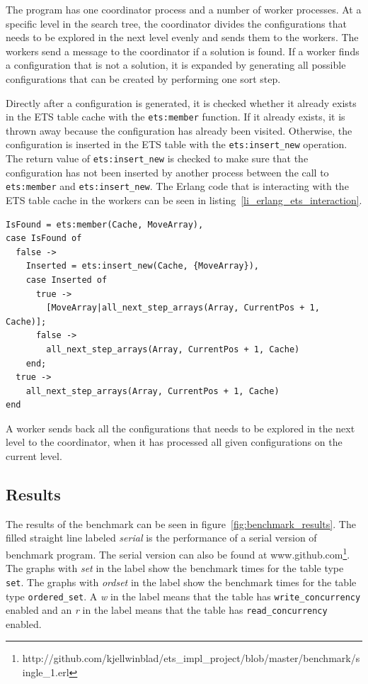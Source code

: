 \documentclass[aps,pre,preprint,nofootinbib]{revtex4}
\begin{document}
    The program has one coordinator process and a number of worker processes.
    At a specific level in the search tree, the coordinator divides the configurations that needs to be explored in the next level evenly and sends them to the workers.
    The workers send a message to the coordinator if a solution is found.
    If a worker finds a configuration that is not a solution, it is expanded by generating all possible configurations that can be created by performing one sort step.
    
    Directly after a configuration is generated, it is checked whether it already exists in the ETS table cache with the \verb|ets:member| function.
    If it already exists, it is thrown away because the configuration has already been visited.
    Otherwise, the configuration is inserted in the ETS table with the \verb|ets:insert_new| operation.
    The return value of \verb|ets:insert_new| is checked to make sure that the configuration has not been inserted by another process between the call to \verb|ets:member| and \verb|ets:insert_new|.
    The Erlang code that is interacting with the ETS table cache in the workers can be seen in listing~\ref{li_erlang_ets_interaction}.

    \lstset{language=erlang, caption=Worker code that is interacting with ETS, label=li_erlang_ets_interaction} 
\begin{lstlisting}[float=htb] 
IsFound = ets:member(Cache, MoveArray),
case IsFound of
  false ->
    Inserted = ets:insert_new(Cache, {MoveArray}),
    case Inserted of
      true ->
        [MoveArray|all_next_step_arrays(Array, CurrentPos + 1, Cache)];
      false ->
        all_next_step_arrays(Array, CurrentPos + 1, Cache)
    end;
  true ->
    all_next_step_arrays(Array, CurrentPos + 1, Cache)
end
\end{lstlisting}
    
    A worker sends back all the configurations that needs to be explored in the next level to the coordinator, when it has processed all given configurations on the current level.


\subsection{Results}

  The results of the benchmark can be seen in figure~\ref{fig:benchmark_results}.
  The filled straight line labeled \emph{serial} is the performance of a serial version of benchmark program.
  The serial version can also be found at www.github.com\footnote{http://github.com/kjellwinblad/ets\_impl\_project/blob/master/benchmark/single\_1.erl}.
  The graphs with \emph{set} in the label show the benchmark times for the table type \verb|set|.
  The graphs with \emph{ordset} in the label show the benchmark times for the table type \verb|ordered_set|.
  A \emph{w} in the label means that the table has \verb|write_concurrency| enabled and an \emph{r} in the label means that the table has \verb|read_concurrency| enabled.
  
\end{document}

